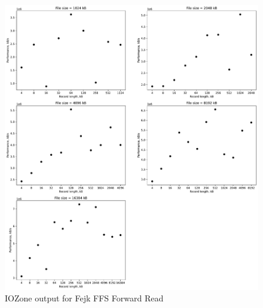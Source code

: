 \begin{figure}[!htb]
	\label{fig:app_bencfh_ffs_read}
	\begin{center}
		\includegraphics[width=1.0\textwidth]{figures/benchmarking/fejk-ffs/Read.pdf}
	\end{center}
	\caption{IOZone output for Fejk FFS Forward Read}
\end{figure}

